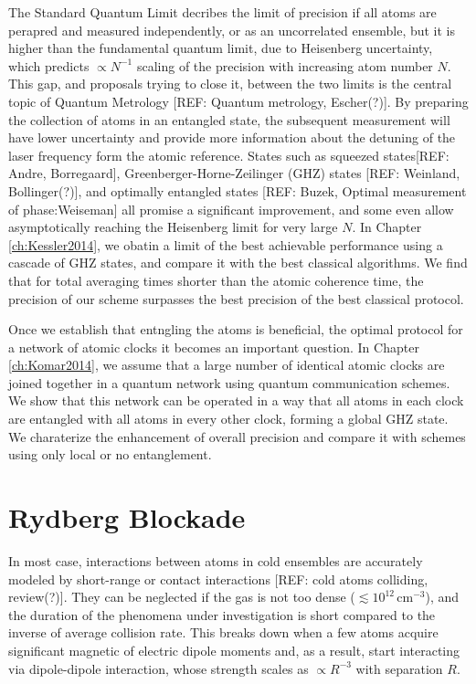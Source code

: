 The Standard Quantum Limit decribes the limit of precision if all atoms are
perapred and measured independently, or as an uncorrelated ensemble, but it is
higher than the fundamental quantum limit, due to Heisenberg uncertainty, which
predicts $\propto N^{-1}$ scaling of the precision with increasing atom number
$N$. This gap, and proposals trying to close it, between the two limits is the
central topic of Quantum Metrology [REF: Quantum metrology, Escher(?)]. By
preparing the collection of atoms in an entangled state, the subsequent
measurement will have lower uncertainty and provide more information about the
detuning of the laser frequency form the atomic reference. States such as
squeezed states[REF: Andre, Borregaard], Greenberger-Horne-Zeilinger (GHZ)
states [REF: Weinland, Bollinger(?)], and optimally entangled states [REF: Buzek,
Optimal measurement of phase:Weiseman] all promise a significant improvement,
and some even allow asymptotically reaching the Heisenberg limit for very large
$N$. In Chapter \ref{ch:Kessler2014}, we obatin a limit of the best achievable
performance using a cascade of GHZ states, and compare it with the best
classical algorithms. We find that for total averaging times shorter than the
atomic coherence time, the precision of our scheme surpasses the best
precision of the best classical protocol.

Once we establish that entngling the atoms is beneficial, the optimal
protocol for a network of atomic clocks it becomes an important question. In
Chapter \ref{ch:Komar2014}, we assume that a large number of identical atomic
clocks are joined together in a quantum network using quantum communication
schemes. We show that this network can be operated in a way that all atoms in
each clock are entangled with all atoms in every other clock, forming a global
GHZ state. We charaterize the enhancement of overall precision and compare it
with schemes using only local or no entanglement.





\section{Rydberg Blockade}
In most case, interactions between atoms in cold ensembles are accurately
modeled by short-range or contact interactions [REF: cold atoms colliding,
review(?)].
They can be neglected if the gas is not too dense ($ \lesssim
10^{12}\,\mathrm{cm}^{-3}$), and the duration of the phenomena under
investigation is short compared to the inverse of average collision rate. This
breaks down when a few atoms acquire significant magnetic of electric dipole
moments and, as a result, start interacting via dipole-dipole interaction, whose
strength scales as $\propto R^{-3}$ with separation $R$.

